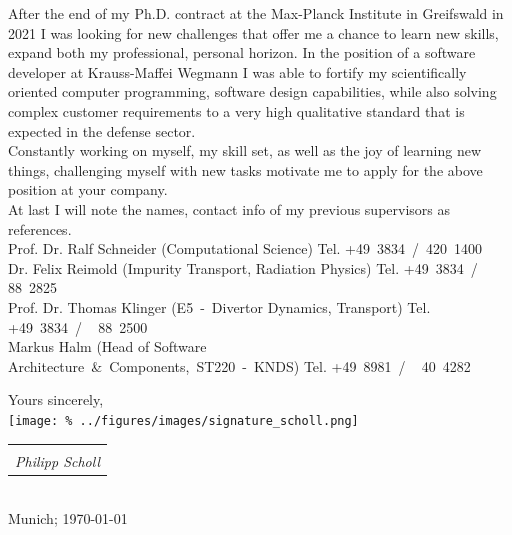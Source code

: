\documentclass[11pt,a4paper]{moderncv}
\makeatletter
\newcommand{\sign}[1]{%
  \begin{tabular}[t]{@{}l@{}}
  \makebox[1.5in]{\dotfill}\\
  \strut\emph{#1}\strut%
  \end{tabular}}%
\makeatother
\begin{document}
%
After the end of my Ph.D. contract at the Max-Planck Institute in Greifswald in 2021 I was looking for new challenges that offer me a chance to learn new skills, expand both my professional, personal horizon. In the position of a software developer at Krauss-Maffei Wegmann I was able to fortify my scientifically oriented computer programming, software design capabilities, while also solving complex customer requirements to a very high qualitative standard that is expected in the defense sector.\\[0.25cm]%
%
Constantly working on myself, my skill set, as well as the joy of learning new things, challenging myself with new tasks motivate me to apply for the above position at your company.\\[0.25cm]%
%
At last I will note the names, contact info of my previous supervisors as references.\\[0.25cm]%
%
\hspace*{0.5cm}Prof. Dr. Ralf Schneider (Computational Science)%
\hfill Tel. +49~3834~/~420~1400\\
\hspace*{0.5cm}Dr. Felix Reimold (Impurity Transport, Radiation Physics)%
\hfill Tel. +49~3834~/~~\,88~2825\\
\hspace*{0.5cm}Prof. Dr. Thomas Klinger (E5~-~Divertor Dynamics, Transport)%
\hfill Tel. +49~3834~/~~\,88~2500\\
\hspace*{0.5cm}Markus Halm (Head of Software\\%
\hspace*{2.95cm}Architecture~\&~Components,~ST220~-~KNDS)%
\hfill Tel. +49~8981~/~~\,40~4282\\%
%
\begin{flushleft}%
    Yours sincerely,\\[0.1cm]%
    \texttt{[image: \%
        ../figures/images/signature\_scholl.png]}\\%
    \vspace*{-.5cm}%
    \sign{Philipp Scholl}\\[0.0cm]%
    Munich; \today%
\end{flushleft}%
%
\end{document}
